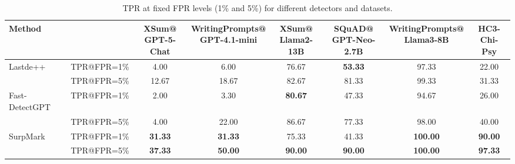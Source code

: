 \documentclass{article}
\theoremstyle{plain}
\theoremstyle{definition}
\theoremstyle{remark}
\begin{document}
\begin{table}[htbp]
\centering
{\tiny
\begin{tabular}{l l c c c c c c }
\toprule
Method          &            & 
\makecell{XSum@\\GPT-5-Chat} & 
\makecell{WritingPrompts@\\GPT-4.1-mini} & 
\makecell{XSum@\\Llama2-13B} & 
\makecell{SQuAD@\\GPT-Neo-2.7B} & 
\makecell{WritingPrompts@\\Llama3-8B} & 
\makecell{HC3-Chi-\\Psy}  \\
\midrule
Lastde++        & TPR@FPR=1\%    & 4.00            & 6.00                         & 76.67           & \textbf{53.33}     & 97.33                     & 22.00        \\
       & TPR@FPR=5\%    & 12.67           & 18.67                        & 82.67           & 81.33              & 99.33                     & 31.33     \\
Fast-DetectGPT  & TPR@FPR=1\%    & 2.00            & 3.30                         & \textbf{80.67}  & 47.33              & 94.67                     & 26.00        \\
  & TPR@FPR=5\%    & 4.00            & 22.00                        & 86.67           & 77.33              & 98.00                     & 40.00       \\
SurpMark        & TPR@FPR=1\%    & \textbf{31.33}  & \textbf{31.33}               & 75.33           & 41.33              & \textbf{100.00}           & \textbf{90.00}  \\
       & TPR@FPR=5\%    & \textbf{37.33}  & \textbf{50.00}               & \textbf{90.00}  & \textbf{90.00}     & \textbf{100.00}           & \textbf{97.33}  \\
\bottomrule
\end{tabular}
\caption{TPR at fixed FPR levels (1\% and 5\%) for different detectors and datasets.}
\label{tab:tpr-fpr}}
\end{table}


\end{document}
